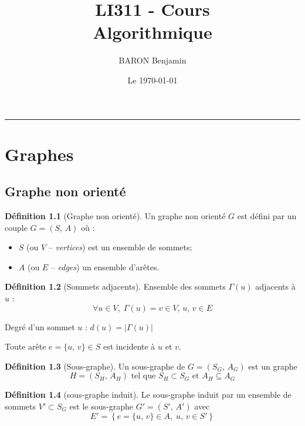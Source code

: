 \documentclass[11pt,english,french]{scrreprt}
\makeatletter
\theoremstyle{remark}
\theoremstyle{definition}
\newtheorem*{def*}{Définition}
\renewcommand{\maketitle}{\begingroup%
    \let\footnotesize\small
    \let\footnoterule\relax
    \parindent \z@
    \reset@font
    \begin{flushleft}
      \huge \sffamily \bfseries\color{orange} \@title
    \end{flushleft}
    \hrule height 1pt
    \begin{flushright}
      \large\sffamily\color{MyDarkBlue}\@author
    \end{flushright}
  \endgroup%
  \setcounter{footnote}{0}%
}
\makeatother
\begin{document}
\author{BARON Benjamin }
\date{Le \today}

\title{LI311 - Cours\\
Algorithmique}


\maketitle

\chapter{Graphes} %

\section{Graphe non orienté} %

\begin{def*}[Graphe non orienté]
	 Un graphe non orienté $G$ est défini par un couple $G=(S,\,A)$ où :\begin{itemize}
		\item $S$ (ou $V$ -- \emph{vertices}) est un ensemble de sommets;
		\item $A$ (ou $E$ -- \emph{edges}) un ensemble d'arêtes.
	\end{itemize}
\end{def*}

\begin{def*}[Sommets adjacents]
	Ensemble des sommets $\Gamma(u)$ adjacents à $u$ : 
	\begin{displaymath}
		\forall u\in V,\;\Gamma(u)=v\in V,\,{u,\,v}\in E
	\end{displaymath}
\end{def*}

Degré d'un sommet $u$ : $d(u)=|\Gamma(u)|$

Toute arête $e=\{u,\,v\}\in S$ est incidente à $u$ et $v$.

\begin{def*}[Sous-graphe]
	Un sous-graphe de $G=(S_G,\,A_G)$ est un graphe 
	\begin{displaymath}
		H=(S_H,\,A_H) \textrm{ tel que } S_H\subset S_G \textrm{ et } A_H\subseteq A_G
	\end{displaymath}
\end{def*}


\begin{def*}[sous-graphe induit]
	Le sous-graphe induit par un ensemble de sommets $V'\subset S_G$ est le sous-graphe $G'=(S',\,A')$ avec
	\begin{displaymath}
		E'=\left\{e=\{u,\,v\}\in A,\;u,\,v\in S'\right\}
	\end{displaymath}
\end{def*}
\end{document}
